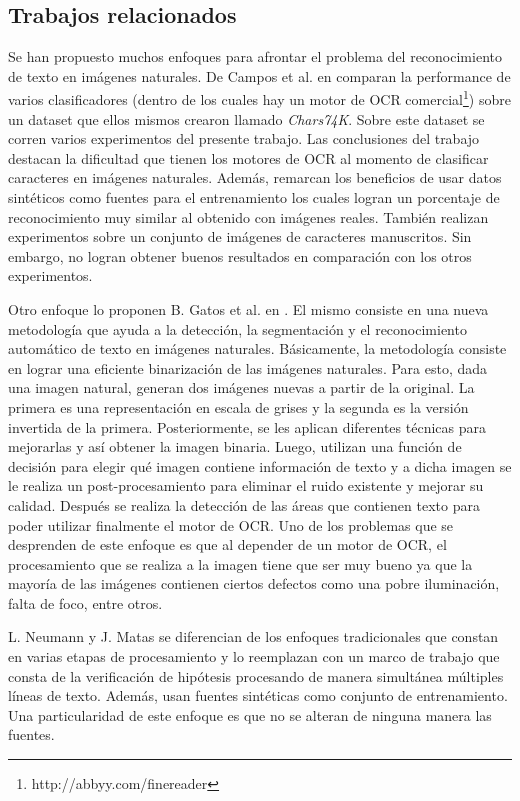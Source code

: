 \subsection{Trabajos relacionados}

	
	Se han propuesto muchos enfoques para afrontar el problema del reconocimiento de texto en imágenes naturales. De Campos et al. en \cite{dCBV09} comparan la performance de varios clasificadores (dentro de los cuales hay un motor de OCR comercial\footnote{http://abbyy.com/finereader}) sobre un dataset que ellos mismos crearon llamado \textit{Chars74K}. Sobre este dataset se corren varios experimentos del presente trabajo. Las conclusiones del trabajo destacan la dificultad que tienen los motores de OCR al momento de clasificar caracteres en imágenes naturales. Además, remarcan los beneficios de usar datos sintéticos como fuentes para el entrenamiento los cuales logran un porcentaje de reconocimiento muy similar al obtenido con imágenes reales. También realizan experimentos sobre un conjunto de imágenes de caracteres manuscritos. Sin embargo, no logran obtener buenos resultados en comparación con los otros experimentos. 
	
	Otro enfoque lo proponen B. Gatos et al. en \cite{GPP03}. El mismo consiste en una nueva metodología que ayuda a la detección, la segmentación y el reconocimiento automático de texto en imágenes naturales. Básicamente, la metodología consiste en lograr una eficiente binarización de las imágenes naturales. Para esto, dada una imagen natural, generan dos imágenes nuevas a partir de la original. La primera es una representación en escala de grises y la segunda es la versión invertida de la primera. Posteriormente, se les aplican diferentes técnicas para mejorarlas y así obtener la imagen binaria. Luego, utilizan una función de decisión para elegir qué imagen contiene información de texto y a dicha imagen se le realiza un post-procesamiento para eliminar el ruido existente y mejorar su calidad. Después se realiza la detección de las áreas que contienen texto para poder utilizar finalmente el motor de OCR. Uno de los problemas que se desprenden de este enfoque es que al depender de un motor de OCR, el procesamiento que se realiza a la imagen tiene que ser muy bueno ya que la mayoría de las imágenes contienen ciertos defectos como una pobre iluminación, falta de foco, entre otros.

	L. Neumann y J. Matas \cite{LNJM} se diferencian de los enfoques tradicionales que constan en varias etapas de procesamiento y lo reemplazan con un marco de trabajo que consta de la verificación de hipótesis procesando de manera simultánea múltiples líneas de texto. Además, usan fuentes sintéticas como conjunto de entrenamiento. Una particularidad de este enfoque es que no se alteran de ninguna manera las fuentes.
	